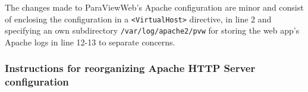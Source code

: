 

The changes made to ParaViewWeb's Apache configuration are minor and consist of
enclosing the configuration in a \texttt{<VirtualHost>} directive,  in line 2
and specifying an own subdirectory \texttt{/var/log/apache2/pvw} for storing the
web app's Apache logs in line 12-13 to separate concerns.



\subsubsection*{Instructions for reorganizing Apache HTTP Server configuration}

